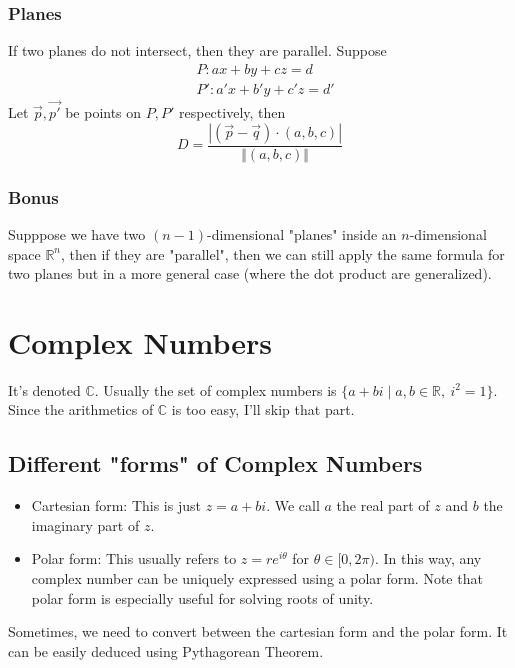 \documentclass{article}
\theoremstyle{definition}
\theoremstyle{definition}
\theoremstyle{definition}
\theoremstyle{definition}
\theoremstyle{definition}
\theoremstyle{definition}
\theoremstyle{definition}
\theoremstyle{definition}
\theoremstyle{definition}
\newcommand{\RR}{\mathbb{R}}
\newcommand{\CC}{\mathbb{C}}
\begin{document}
\subsubsection{Planes}
If two planes do not intersect, then they are parallel.
Suppose 
\begin{align*}
    &P:ax+by+cz=d\\
    &P':a'x+b'y+c'z=d'
\end{align*}
Let $\vec{p},\vec{p'}$ be points on $P,P'$ respectively, then
\[
D=\dfrac{|(\vec{p}-\vec{q})\cdot(a,b,c)|}{\Vert (a,b,c)\Vert}   
\]
\subsubsection{Bonus}
Supppose we have two $(n-1)$-dimensional "planes" inside an $n$-dimensional space $\RR^n$, then if they are "parallel", then we can still apply the same formula for two planes but in a more general case (where the dot product are generalized). 

\section{Complex Numbers}
It's denoted $\CC$. Usually the set of complex numbers is $\{a+bi\mid a,b\in\RR,\ i^2=1\}$. Since the arithmetics of $\CC$ is too easy,
I'll skip that part.
\subsection{Different "forms" of Complex Numbers}
\begin{itemize}
    \item Cartesian form: This is just $z=a+bi$. We call $a$ the real part of $z$ and $b$ the imaginary part of $z$.
    \item Polar form: This usually refers to $z=re^{i\theta}$ for $\theta\in[0,2\pi)$. In this way, any complex number can be uniquely expressed using a polar form. Note that polar form is especially useful for solving roots of unity.
\end{itemize}
Sometimes, we need to convert between the cartesian form and the polar form. It can be easily deduced using Pythagorean Theorem.
\end{document}

